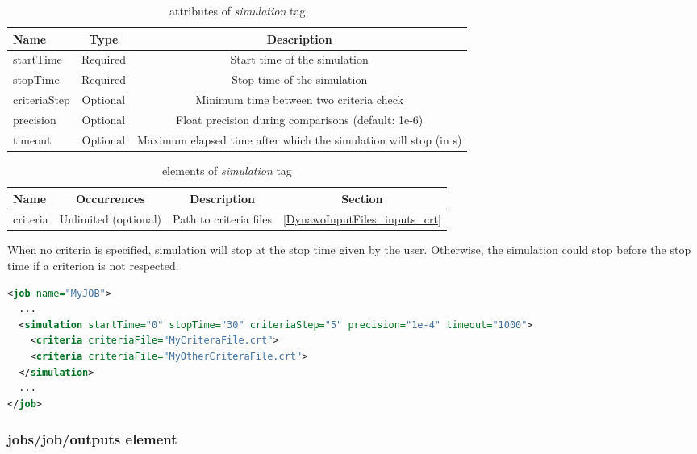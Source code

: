 \documentclass[a4paper, 12pt]{report}
\begin{document}
\begin{table}[H]
\center
\begin{tabular}{ l | c | c }
\toprule
\textbf{{Name}} & \textbf{{Type}} & \textbf{{Description}}\\
\midrule
\rowcolor{white}
\small{startTime} & \small{Required} & \small{Start time of the simulation}\\
\rowcolor{gray!10}
\small{stopTime} & \small{Required} & \small{Stop time of the simulation}\\
\rowcolor{white}
\small{criteriaStep} & \small{Optional} & \small{Minimum time between two criteria check}\\
\rowcolor{gray!10}
\small{precision} & \small{Optional} & \small{Float precision during comparisons (default: 1e-6)}\\
\rowcolor{white}
\small{timeout} & \small{Optional} & \small{Maximum elapsed time after which the simulation will stop (in s)}\\
\bottomrule
\end{tabular}
\caption{attributes of \textit{simulation} tag}
\end{table}

\begin{table}[H]
\center
\begin{tabular}{ l | c | c | c }
\toprule
\textbf{{Name}} & \textbf{{Occurrences}} & \textbf{{Description}}& \textbf{{Section}}\\
\midrule
\rowcolor{white}
\small{criteria} & \small{Unlimited (optional)} & \small{Path to criteria files}  & \ref{DynawoInputFiles_inputs_crt}\\
\bottomrule
\end{tabular}
\caption{elements of \textit{simulation} tag}
\end{table}


When no criteria is specified, simulation will stop at the stop time given by
the user. Otherwise, the simulation could stop before the stop
time if a criterion is not respected.

\begin{lstlisting}[language=XML, morekeywords={network, dynModels, initialState, precompiledModels, modelicaModels}]
<job name="MyJOB">
  ...
  <simulation startTime="0" stopTime="30" criteriaStep="5" precision="1e-4" timeout="1000">
    <criteria criteriaFile="MyCriteraFile.crt">
    <criteria criteriaFile="MyOtherCriteraFile.crt">
  </simulation>
  ...
</job>
\end{lstlisting}

\subsubsection{jobs/job/outputs element}
\label{DynawoInputFiles_inputs_jobs_job_outputs}
\end{document}
